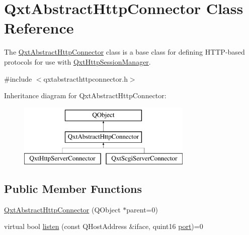 \hypertarget{class_qxt_abstract_http_connector}{\section{Qxt\-Abstract\-Http\-Connector Class Reference}
\label{class_qxt_abstract_http_connector}
}


The \hyperlink{class_qxt_abstract_http_connector}{Qxt\-Abstract\-Http\-Connector} class is a base class for defining H\-T\-T\-P-\/based protocols for use with \hyperlink{class_qxt_http_session_manager}{Qxt\-Http\-Session\-Manager}.  




{\ttfamily \#include $<$qxtabstracthttpconnector.\-h$>$}

Inheritance diagram for Qxt\-Abstract\-Http\-Connector\-:\begin{figure}[H]
\begin{center}
\leavevmode
\includegraphics[height=3.000000cm]{class_qxt_abstract_http_connector}
\end{center}
\end{figure}
\subsection*{Public Member Functions}
\begin{DoxyCompactItemize}
\item 
\hyperlink{class_qxt_abstract_http_connector_a63e18a259e29e17cde601fab00e52e0a}{Qxt\-Abstract\-Http\-Connector} (Q\-Object $\ast$parent=0)
\item 
virtual bool \hyperlink{class_qxt_abstract_http_connector_acda112d498fcb274bd843aca5deea365}{listen} (const Q\-Host\-Address \&iface, quint16 \hyperlink{classport}{port})=0
\end{DoxyCompactItemize}
